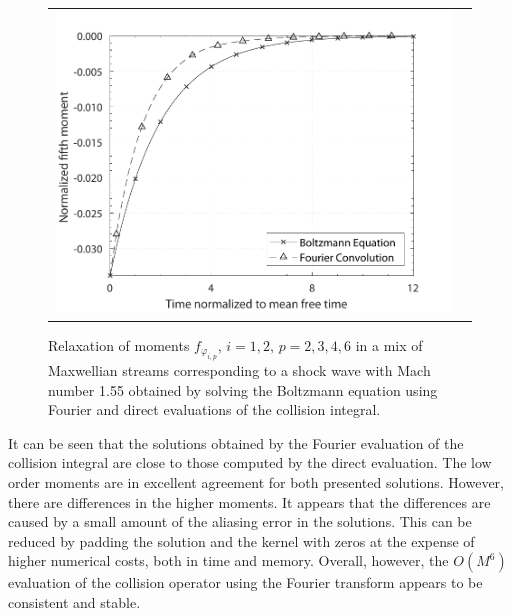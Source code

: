 \documentclass[12pt]{CSUNthesis}
\begin{document}
\begin{center}
\begin{figure}[h]
\begin{tabular}{@{}cc@{}}
  \includegraphics[height=.218\textheight]{images/m155_15N_mom6.pdf}\\
  \end{tabular}
\caption{\label{fig03} Relaxation of moments $f_{\varphi_{i,p}}$, $i=1,2$, $p=2,3,4,6$ 
in a mix of Maxwellian streams corresponding to a shock wave with 
Mach number 1.55 obtained by solving the Boltzmann equation using Fourier and direct evaluations of the collision integral.}
\end{figure}
\end{center}

It can be seen that the solutions obtained by the Fourier evaluation of the collision 
integral are close to those computed by the direct evaluation. The low order moments 
are in excellent agreement for both presented solutions. However, there are 
differences in the higher moments. It appears that the differences are caused 
by a small amount of the aliasing error in the solutions. This can be reduced 
by padding the solution and the kernel with zeros at the expense of higher numerical 
costs, both in time and memory. Overall, however, the $O(M^6)$ evaluation of 
the collision operator using the Fourier transform appears to be consistent 
and stable. 

\clearpage
{}


\end{document}
